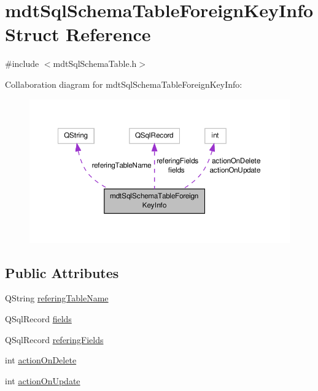 \hypertarget{structmdt_sql_schema_table_foreign_key_info}{\section{mdt\-Sql\-Schema\-Table\-Foreign\-Key\-Info Struct Reference}
\label{structmdt_sql_schema_table_foreign_key_info}
}


{\ttfamily \#include $<$mdt\-Sql\-Schema\-Table.\-h$>$}



Collaboration diagram for mdt\-Sql\-Schema\-Table\-Foreign\-Key\-Info\-:
\nopagebreak
\begin{figure}[H]
\begin{center}
\leavevmode
\includegraphics[width=350pt]{structmdt_sql_schema_table_foreign_key_info__coll__graph}
\end{center}
\end{figure}
\subsection*{Public Attributes}
\begin{DoxyCompactItemize}
\item 
Q\-String \hyperlink{structmdt_sql_schema_table_foreign_key_info_a67a54a858ca960ed0da71f734bb222b1}{refering\-Table\-Name}
\item 
Q\-Sql\-Record \hyperlink{structmdt_sql_schema_table_foreign_key_info_a889196c9a4cb8c89722de9f03fa6daae}{fields}
\item 
Q\-Sql\-Record \hyperlink{structmdt_sql_schema_table_foreign_key_info_a23be89174f7131ce33047b11da180504}{refering\-Fields}
\item 
int \hyperlink{structmdt_sql_schema_table_foreign_key_info_a0c653ac4f2e5fdfe9dce56bfb4f09ee5}{action\-On\-Delete}
\item 
int \hyperlink{structmdt_sql_schema_table_foreign_key_info_ae43338084ff992252607f38078053475}{action\-On\-Update}
\end{DoxyCompactItemize}


